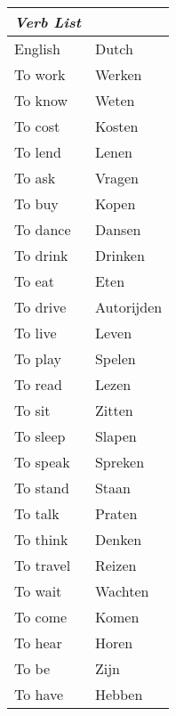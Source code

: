 \documentclass[letterpaper,11pt]{article}
\begin{document}
\begin{tabular}[t]{|l | l|}
    \hline
    \textit{Verb List} &   \\
    \hline
    English   & Dutch      \\
    \hline
    To work   & Werken     \\
    To know   & Weten      \\
    To cost   & Kosten     \\
    To lend   & Lenen      \\
    To ask    & Vragen     \\
    To buy    & Kopen      \\
    To dance  & Dansen     \\
    To drink  & Drinken    \\
    To eat    & Eten       \\
    To drive  & Autorijden \\
    To live   & Leven      \\
    To play   & Spelen     \\
    To read   & Lezen      \\
    To sit    & Zitten     \\
    To sleep  & Slapen     \\
    To speak  & Spreken    \\
    To stand  & Staan      \\
    To talk   & Praten     \\
    To think  & Denken     \\
    To travel & Reizen     \\
    To wait   & Wachten    \\
    To come   & Komen      \\
    To hear   & Horen      \\
    To be     & Zijn       \\
    To have   & Hebben     \\
    \hline
\end{tabular}
\end{document}
